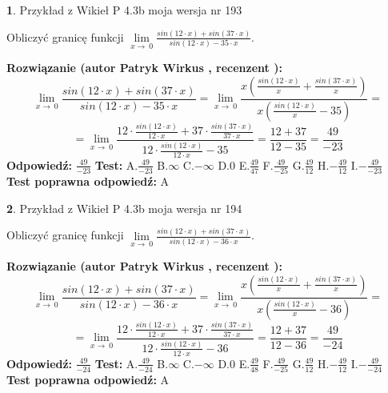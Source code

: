 \documentclass[12pt, a4paper]{article}
\theoremstyle{definition} %
\newtheorem{zad}{}
\newcommand{\zadStart}[1]{\begin{zad}#1\newline}
\newcommand{\zadStop}{\end{zad}}
\newcommand{\rozwStart}[2]{\noindent \textbf{Rozwiązanie (autor #1 , recenzent #2): }\newline}
\newcommand{\rozwStop}{\newline}
\newcommand{\odpStart}{\noindent \textbf{Odpowiedź:}\newline}
\newcommand{\odpStop}{\newline}
\newcommand{\testStart}{\noindent \textbf{Test:}\newline}
\newcommand{\testStop}{\newline}
\newcommand{\kluczStart}{\noindent \textbf{Test poprawna odpowiedź:}\newline}
\newcommand{\kluczStop}{\newline}
\begin{document}
\zadStart{Przykład z Wikieł P 4.3b moja wersja nr 193}


Obliczyć granicę funkcji $\lim\limits_{x\to\ 0}\frac{sin(12 \cdot x)+sin(37 \cdot x)}{sin(12 \cdot x)-35 \cdot x}$.
\zadStop
\rozwStart{Patryk Wirkus}{}
$$\lim\limits_{x\to\ 0}\frac{sin(12 \cdot x)+sin(37 \cdot x)}{sin(12 \cdot x)-35 \cdot x}=\lim\limits_{x\to\ 0}\frac{x(\frac{sin(12 \cdot x)}{x}+\frac{sin(37 \cdot x)}{x})}{x(\frac{sin(12 \cdot x)}{x}-35)}=$$
$$=\lim\limits_{x\to\ 0}\frac{12 \cdot \frac{sin(12 \cdot x)}{12 \cdot x}+37 \cdot \frac{sin(37 \cdot x)}{37 \cdot x}}{12 \cdot \frac{sin(12 \cdot x)}{12 \cdot x}-35}=\frac{12+37}{12-35} = \frac{49}{-23}$$
\rozwStop
\odpStart
$\frac{49}{-23}$
\odpStop
\testStart
A.$\frac{49}{-23}$
B.$\infty$
C.$-\infty$
D.$0$
E.$\frac{49}{47}$
F.$\frac{49}{-25}$
G.$\frac{49}{12}$
H.$-\frac{49}{12}$
I.$-\frac{49}{-23}$
\testStop
\kluczStart
A
\kluczStop



\zadStart{Przykład z Wikieł P 4.3b moja wersja nr 194}


Obliczyć granicę funkcji $\lim\limits_{x\to\ 0}\frac{sin(12 \cdot x)+sin(37 \cdot x)}{sin(12 \cdot x)-36 \cdot x}$.
\zadStop
\rozwStart{Patryk Wirkus}{}
$$\lim\limits_{x\to\ 0}\frac{sin(12 \cdot x)+sin(37 \cdot x)}{sin(12 \cdot x)-36 \cdot x}=\lim\limits_{x\to\ 0}\frac{x(\frac{sin(12 \cdot x)}{x}+\frac{sin(37 \cdot x)}{x})}{x(\frac{sin(12 \cdot x)}{x}-36)}=$$
$$=\lim\limits_{x\to\ 0}\frac{12 \cdot \frac{sin(12 \cdot x)}{12 \cdot x}+37 \cdot \frac{sin(37 \cdot x)}{37 \cdot x}}{12 \cdot \frac{sin(12 \cdot x)}{12 \cdot x}-36}=\frac{12+37}{12-36} = \frac{49}{-24}$$
\rozwStop
\odpStart
$\frac{49}{-24}$
\odpStop
\testStart
A.$\frac{49}{-24}$
B.$\infty$
C.$-\infty$
D.$0$
E.$\frac{49}{48}$
F.$\frac{49}{-25}$
G.$\frac{49}{12}$
H.$-\frac{49}{12}$
I.$-\frac{49}{-24}$
\testStop
\kluczStart
A
\kluczStop
\end{document}
